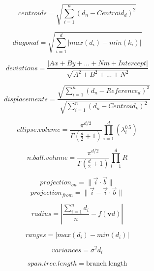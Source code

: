 \documentclass[]{book}
\begin{document}
\begin{equation}
    centroids = \sqrt{\sum_{i=1}^{n}{({d}_{n}-Centroid_{d})^2}}
\end{equation}

\begin{equation}
    diagonal = \sqrt{\sum_{i=1}^{d}|max(d_i) - min(k_i)|}
\end{equation}

\begin{equation}
    deviations = \frac{|Ax + By + ... + Nm + Intercept|}{\sqrt{A^2 + B^2 + ... + N^2}}
\end{equation}

\begin{equation}
    displacements = \frac{\sqrt{\sum_{i=1}^{n}{({d}_{n}-Reference_{d})^2}}}{\sqrt{\sum_{i=1}^{n}{({d}_{n}-Centroid_{k})^2}}}
\end{equation}

\begin{equation}
    ellipse.volume = \frac{\pi^{d/2}}{\Gamma(\frac{d}{2}+1)}\displaystyle\prod_{i=1}^{d} (\lambda_{i}^{0.5})
\end{equation}

\begin{equation}
    n.ball.volume = \frac{\pi^{d/2}}{\Gamma(\frac{d}{2}+1)}\displaystyle\prod_{i=1}^{d} R
\end{equation}

\begin{equation}
    projection_{on} = \| \overrightarrow{i} \cdot \overrightarrow{b} \|
\end{equation}
\begin{equation}
    projection_{from} = \| \overrightarrow{i} - \overrightarrow{i} \cdot \overrightarrow{b} \|
\end{equation}

\begin{equation}
    radius = |\frac{\sum_{i=1}^{n}d_i}{n} - f(\mathbf{v}d)|
\end{equation}

\begin{equation}
    ranges = |max(d_i) - min(d_i)|
\end{equation}

\begin{equation}
    variances = \sigma^{2}{d_i}
\end{equation}

\begin{equation}
    span.tree.length = \mathrm{branch\ length}
\end{equation}
\end{document}
